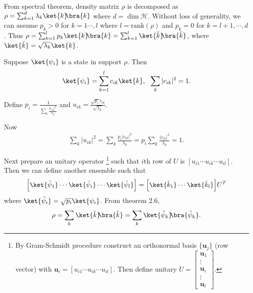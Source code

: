 \documentclass[10pt]{book}
\newcommand{\kb}[1]{\ket{#1}\hspace{-1mm} \bra{#1}} %
\begin{document}
	
	From spectral theorem, density matrix $\rho$ is decomposed as $\rho = \sum_{k=1}^{d} \lambda_k \kb{k}$ where $d = \dim \mathcal{H}$.
	Without loss of generality, we can assume $p_k > 0$ for $k = 1 \cdots , l$ where $l = \mathrm{rank} (\rho)$ and $p_k = 0$ for $k = l+1, \cdots, d$.
	Thus $\rho = \sum_{k=1}^{l} p_k \kb{k} = \sum_{k=1}^{l} \kb{\tilde{k}}$, where $\ket{\tilde{k}} = \sqrt{\lambda_k} \ket{k}$.
	
	Suppose $\ket{\psi_i}$ is a state in support $\rho$. Then
	\begin{equation}
\begin{aligned}
		\ket{\psi_i} = \sum_{k=1}^l c_{ik} \ket{k}, ~~ \sum_k |c_{ik}|^2 = 1.
	\end{aligned}
\end{equation}
	
	Define $\displaystyle p_i = \frac{1}{\sum_k \frac{|c_{ik}|^2}{\lambda_k} }$ and $\displaystyle u_{ik} = \frac{\sqrt{p_i} c_{ik}}{\sqrt{\lambda_k}}$.
	
	Now
	\begin{equation}
\begin{aligned}
		\sum_k |u_{ik}|^2 = \sum_k \frac{p_i | c_{ik} |^2 }{\lambda_k} = p_i \sum_k \frac{| c_{ik} |^2 }{\lambda_k} = 1.
	\end{aligned}
\end{equation}
	
	Next prepare an unitary operator
	\footnote{By Gram-Schmidt procedure construct an orthonormal basis $\{\boldsymbol{u}_j\}$ (row vector) with $\boldsymbol{u}_i = [u_{i1} \cdots u_{ik} \cdots u_{il}]$. Then define unitary $U = \begin{bmatrix}
			\boldsymbol{u}_1 \\ 
			\vdots \\ 
			\boldsymbol{u}_i \\ 
			\vdots \\ 
			\boldsymbol{u}_l
		\end{bmatrix}$.}
	such that $i$th row of $U$ is $[u_{i1} \cdots u_{ik} \cdots u_{il}]$.
	Then we can define another ensemble such that
	\begin{equation}
\begin{aligned}
		\Big[  \ket{\tilde{\psi}_1} \cdots  \ket{\tilde{\psi}_i} \cdots \ket{\tilde{\psi}_l}\Big] = \Big[ \ket{\tilde{k}_1} \cdots \ket{\tilde{k}_l} \Big] U^T
	\end{aligned}
\end{equation}
	where $\ket{\tilde{\psi_i}} = \sqrt{p_i} \ket{\psi_i}$.
	From theorem 2.6,
	\begin{equation}
\begin{aligned}
		\rho = \sum_k \kb{\tilde{k}} = \sum_k \kb{\tilde{\psi}_k}.
	\end{aligned}
\end{equation}
	
\end{document}
